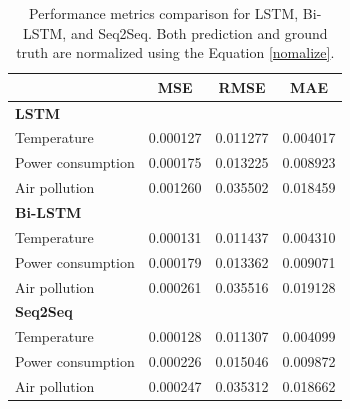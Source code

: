 \documentclass[sn-mathphys-num]{sn-jnl}
\theoremstyle{thmstyleone}%
\theoremstyle{thmstyletwo}%
\theoremstyle{thmstylethree}%
\begin{document}
\begin{table}[h]
\centering
\begin{tabular}{@{}lccc@{}}
\toprule
\textbf{}               & \hspace{0.6cm} \textbf{MSE} & \textbf{RMSE} & \textbf{MAE} \\ \midrule
\textbf{LSTM}           &              &               &              \\
Temperature             & \hspace{0.6cm} 0.000127     & \hspace{1cm} 0.011277      \hspace{1cm} & 0.004017     \\
Power consumption       & \hspace{0.6cm} 0.000175     & 0.013225      & 0.008923     \\
Air pollution           & \hspace{0.6cm} 0.001260     & 0.035502      & 0.018459     \\ \midrule
\textbf{Bi-LSTM}        &              &               &              \\
Temperature             & \hspace{0.6cm} 0.000131     & 0.011437      & 0.004310     \\
Power consumption       & \hspace{0.6cm} 0.000179     & 0.013362      & 0.009071     \\
Air pollution           & \hspace{0.6cm} 0.000261     & 0.035516      & 0.019128     \\ \midrule
\textbf{Seq2Seq}        &              &               &              \\
Temperature             & \hspace{0.6cm} 0.000128     & 0.011307      & 0.004099     \\
Power consumption       & \hspace{0.6cm} 0.000226     & 0.015046      & 0.009872     \\
Air pollution           & \hspace{0.6cm} 0.000247     & 0.035312      & 0.018662       \\ \bottomrule
\end{tabular}
\caption{Performance metrics comparison for LSTM, Bi-LSTM, and Seq2Seq. Both prediction and ground truth are normalized using the Equation \ref{nomalize}.}
\label{tab:lstm_metric}
\end{table}
\end{document}
